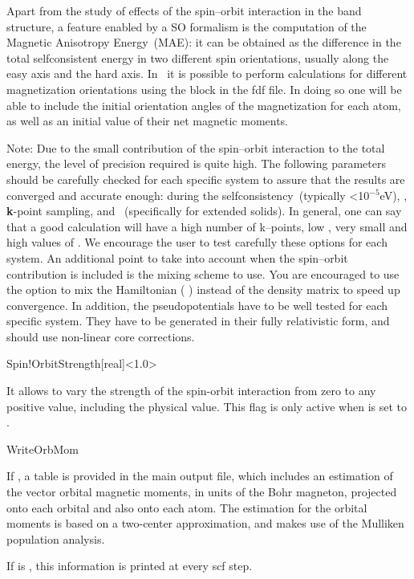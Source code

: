Apart from the study of effects of the spin--orbit interaction in the
band structure, a feature enabled by a SO formalism is the computation
of the Magnetic Anisotropy Energy~(MAE): it can be obtained as the
difference in the total selfconsistent energy in two different spin
orientations, usually along the easy axis and the hard axis. In
\siesta\ it is possible to perform calculations for different
magnetization orientations using the block  in the
fdf file. In doing so one will be able to include the initial
orientation angles of the magnetization for each atom, as well as an
initial value of their net magnetic moments.

Note: Due to the small contribution of the spin--orbit interaction to
the total energy, the level of precision required is quite high. The
following parameters should be carefully checked for each
specific system to assure that the results are converged and accurate enough:
 during the selfconsistency~(typically
<10$^{-5}$eV), , \textbf{k}-point sampling,
and ~(specifically for extended
solids). In general, one can say that a good calculation will have
a high number of k--points, low , very
small  and high values of .  We
encourage the user to test carefully these options for each system. An
additional point to take into account when the spin--orbit
contribution is included is the mixing scheme to use. You are
encouraged to use the option to mix the Hamiltonian ( ) instead of the
density matrix to speed up convergence. In addition, the pseudopotentials
have to be well tested for each specific system. They 
have to be generated in their fully relativistic form, and should use
non-linear core corrections.
 
\begin{fdfentry}{Spin!OrbitStrength}[real]<1.0>

  It allows to vary the strength of the spin-orbit interaction from
  zero to any positive value, including the physical value. This flag
  is only active when  is set to .

\end{fdfentry}

\begin{fdflogicalF}{WriteOrbMom}

  If \fdftrue, a table is provided in the main output file, which
  includes an estimation of the vector orbital magnetic
  moments, in units of the Bohr magneton, projected onto each orbital
  and also onto each atom. The estimation for the orbital moments is
  based on a two-center approximation, and makes use of the Mulliken
  population analysis.

  If  is \fdftrue, this information is printed at
  every scf step.

\end{fdflogicalF}


